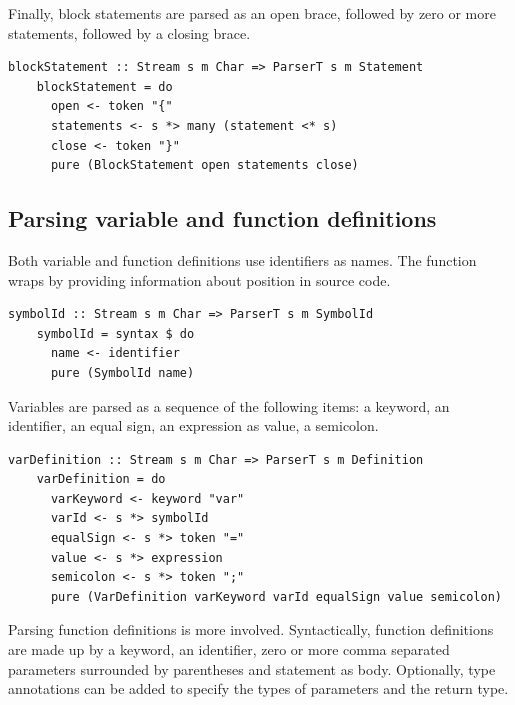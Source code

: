 \documentclass[UdineBachThesis,american,11pt]{PhdThesis}
\begin{document}
  Finally, block statements are parsed as an open brace, followed by zero or
  more statements, followed by a closing brace.

  \begin{lstlisting}[gobble=4,basicstyle=\ttfamily\small]
    blockStatement :: Stream s m Char => ParserT s m Statement
    blockStatement = do
      open <- token "{"
      statements <- s *> many (statement <* s)
      close <- token "}"
      pure (BlockStatement open statements close)
  \end{lstlisting}

  \subsection{Parsing variable and function definitions}

  Both variable and function definitions use identifiers as names. The function
  \lstinline@symbolId@ wraps \lstinline@identifier@ by providing information
  about position in source code.

  \begin{lstlisting}[gobble=4,basicstyle=\ttfamily\small]
    symbolId :: Stream s m Char => ParserT s m SymbolId
    symbolId = syntax $ do
      name <- identifier
      pure (SymbolId name)
  \end{lstlisting}

  Variables are parsed as a sequence of the following items: a \lstinline@var@
  keyword, an identifier, an equal sign, an expression as value, a semicolon.

  \begin{lstlisting}[gobble=4,basicstyle=\ttfamily\small]
    varDefinition :: Stream s m Char => ParserT s m Definition
    varDefinition = do
      varKeyword <- keyword "var"
      varId <- s *> symbolId
      equalSign <- s *> token "="
      value <- s *> expression
      semicolon <- s *> token ";"
      pure (VarDefinition varKeyword varId equalSign value semicolon)
  \end{lstlisting}

  Parsing function definitions is more involved. Syntactically, function
  definitions are made up by a \lstinline@def@ keyword, an identifier, zero or
  more comma separated parameters surrounded by parentheses and statement as
  body. Optionally, type annotations can be added to specify the types of
  parameters and the return type.
\end{document}
